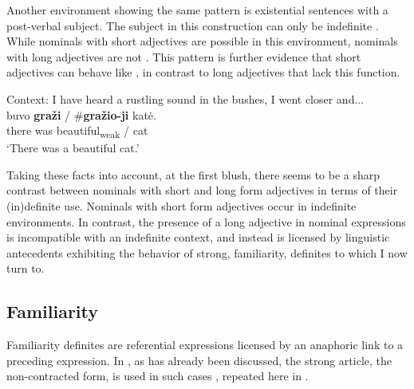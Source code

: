 \documentclass[output=paper,
modfonts
]{langscibook}
\begin{document}
Another environment showing the same pattern is existential sentences with a post-verbal subject. The subject in this construction can only be indefinite \citep{GillonArmoskaite2015}. While nominals with short adjectives are possible in this environment, nominals with long adjectives are not . This pattern is further evidence that short adjectives can behave like , in contrast to long adjectives that lack this function. 

\begin{exe}
\ex \label{ex:sereikaite:34}
Context: I have heard a rustling sound in the bushes, I went closer and...\\
 {buvo} \textbf{graži} \textnormal{/} \textnormal{\#}\textbf{gražio-ji} {katė.} \\
there was {beautiful\textsubscript{weak}} /  cat\\
\trans `There was a beautiful cat.'  
\end{exe}

Taking these facts into account, at the first blush, there seems to be a sharp contrast between nominals with short and long form adjectives in terms of their (in)definite use. Nominals with short form adjectives occur in indefinite environments. In contrast, the presence of a long adjective in nominal expressions is incompatible with an indefinite context, and instead is licensed by linguistic antecedents exhibiting the behavior of strong, familiarity, definites to which I now turn to.

\subsection{Familiarity}
Familiarity definites are referential expressions licensed by an anaphoric link to a preceding expression. In , as has already been discussed, the strong article, the non-contracted form, is used in such cases , repeated here in . \newpage
\end{document}
